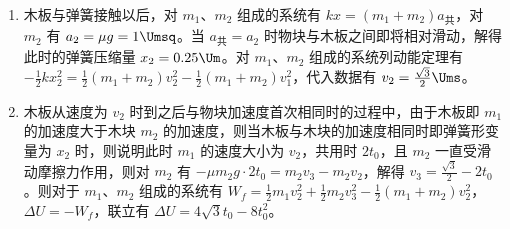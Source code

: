 \documentclass[\gkver]{gaokaozhenti}
\begin{document}
\begin{enumerate}
{\begin{enumerate}
	\item
	木板与弹簧接触以后，对 $m_{1}$、$m_{2}$ 组成的系统有 $kx=(m_{1}+m_{2})a_{\text{共}}$，对 $m_{2}$ 有 $a_{2}=\mu g=1\Umsq$。当 $a_{\text{共}}=a_{2}$ 时物块与木板之间即将相对滑动，解得此时的弹簧压缩量 $x_{2}=0.25\Um$。对 $m_{1}$、$m_{2}$ 组成的系统列动能定理有 $-\frac{1}{2}kx_{2}^{2}=\frac{1}{2}(m_{1}+m_{2})v_{2}^{2}-\frac{1}{2}(m_{1}+m_{2})v_{1}^{2}$，代入数据有 $v_{2}=\frac{\sqrt{3}}{2}\Ums$。
	\item
	木板从速度为 $v_{2}$ 时到之后与物块加速度首次相同时的过程中，由于木板即 $m_{1}$ 的加速度大于木块 $m_{2}$ 的加速度，则当木板与木块的加速度相同时即弹簧形变量为 $x_{2}$ 时，则说明此时 $m_{1}$ 的速度大小为 $v_{2}$，共用时 $2t_{0}$，且 $m_{2}$ 一直受滑动摩擦力作用，则对 $m_{2}$ 有 $-\mu m_{2}g\cdot2t_{0}=m_{2}v_{3}-m_{2}v_{2}$，解得 $v_{3}=\frac{\sqrt{3}}{2}-2t_{0}$。则对于 $m_{1}$、$m_{2}$ 组成的系统有 $W_{f}=\frac{1}{2}m_{1}v_{2}^{2}+\frac{1}{2}m_{2}v_{3}^{2}-\frac{1}{2}(m_{1}+m_{2})v_{2}^{2}$，$\Delta U = -W_{f}$，联立有 $\Delta U = 4\sqrt{3}t_{0}-8t_{0}^{2}$。
\end{enumerate}
}

\end{enumerate}
\end{document}
